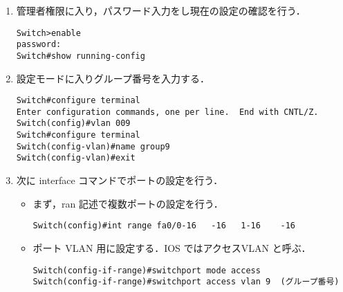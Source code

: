 \documentclass[a4j,titlepage]{jarticle}
\begin{document}
\begin{enumerate}

\item 管理者権限に入り，パスワード入力をし現在の設定の確認を行う．

  \begin{center}
    \begin{screen}
\begin{verbatim}
Switch>enable
password:
Switch#show running-config
\end{verbatim}
\end{screen}
\end{center}

\item 設定モードに入りグループ番号を入力する．

  \begin{center}
    \begin{screen}
\begin{verbatim}
Switch#configure terminal
Enter configuration commands, one per line.  End with CNTL/Z.
Switch(config)#vlan 009
Switch#configure terminal
Switch(config-vlan)#name group9
Switch(config-vlan)#exit
\end{verbatim}
    \end{screen}
    \end{center}

\item 次に interface コマンドでポートの設定を行う．

  \begin{itemize}
  \item まず，ran 記述で複数ポートの設定を行う．
    
  \begin{center}
    \begin{screen}
\begin{verbatim}
Switch(config)#int range fa0/0-16   -16   1-16    -16
\end{verbatim}
\end{screen}
\end{center}

\item  ポート VLAN 用に設定する．IOS ではアクセスVLAN と呼ぶ．

  \begin{center}
    \begin{screen}
\begin{verbatim}
Switch(config-if-range)#switchport mode access
Switch(config-if-range)#switchport access vlan 9  (グループ番号) 
\end{verbatim}
    \end{screen}
  \end{center}


\end{itemize}
\end{enumerate}
\end{document}
